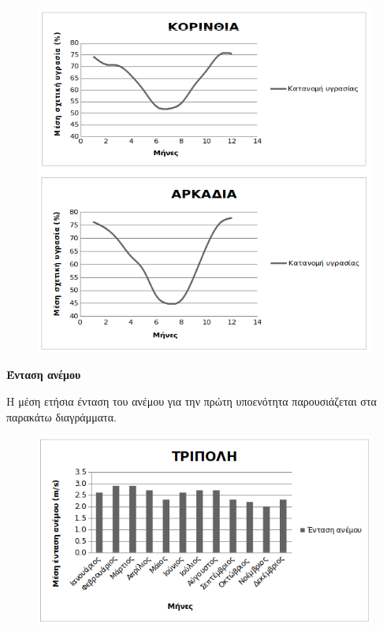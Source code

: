 \documentclass[12pt]{article}
\begin{document}
	\begin{figure} [H]
		\begin{center}
			\includegraphics [scale = 0.80] {ygrasia2.png}
		\end{center}
	\end{figure}

	\textbf{Ένταση ανέμου}
	
	Η μέση ετήσια  ένταση του ανέμου για την πρώτη υποενότητα παρουσιάζεται στα παρακάτω διαγράμματα.
	
	\begin{figure} [H]
		\begin{center}
			\includegraphics [scale = 0.80] {wind1.png}
		\end{center}
	\end{figure}
	
\end{document}
